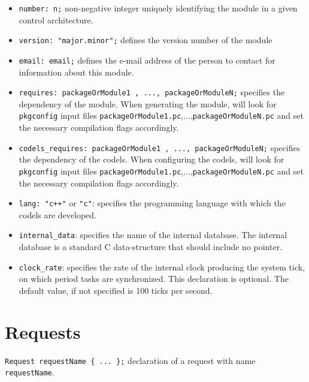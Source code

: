 \begin{itemize}
\item[]{\tt number:  n;} non-negative integer uniquely identifying the module in
a given control architecture.

\item[]\texttt{version:  "major.minor";} defines the version number of the 
module

\item[]\texttt{email:  email;} defines the e-mail address of
the person to contact for information about this module.

\item[]\texttt{requires:  packageOrModule1 , ..., packageOrModuleN;}
specifies the dependency of the module. When generating the module,
{\GenoM} will look for \texttt{pkgconfig} input files
\texttt{packageOrModule1.pc},...,\texttt{packageOrModuleN.pc} and set
the necessary compilation flags accordingly. 

\item[]\texttt{codels\_requires:  packageOrModule1 , ..., packageOrModuleN;}
specifies the dependency of the codels. When configuring the codels,
{\GenoM} will look for \texttt{pkgconfig} input files
\texttt{packageOrModule1.pc},...,\texttt{packageOrModuleN.pc} and set
the necessary compilation flags accordingly. 

\item[]\texttt{lang:  "c++"} or \texttt{"c"}: specifies the programming
language with which the codels are developed.

\item[]{\tt internal\_data}: specifies the name of the internal database.
The internal database is a standard C data-structure that should
include no pointer.

\item[]\texttt{clock\_rate}: specifies the rate of the internal clock
producing the system tick, on which period tasks are synchronized.
This declaration is optional. The default value, if not specified is
100 ticks per second.
\end{itemize}

\section{Requests}
\label{sec|requests}

{\tt Request requestName \{ ... \};} declaration of a request with
name {\tt requestName}.\\

